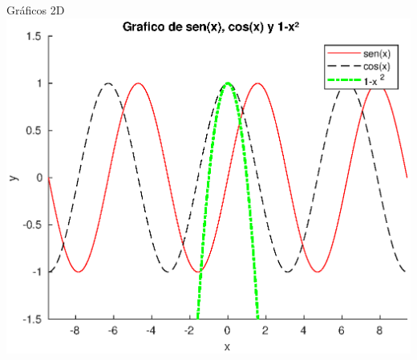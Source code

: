 \documentclass[8pt]{extarticle}
\begin{document}
\begin{multicols}{3}
\begin{exampleBlock}{Gr\'aficos 2D}
            \includegraphics[width=\textwidth]{plotting.eps}
        \end{exampleBlock}



    \end{multicols}
\end{document}
